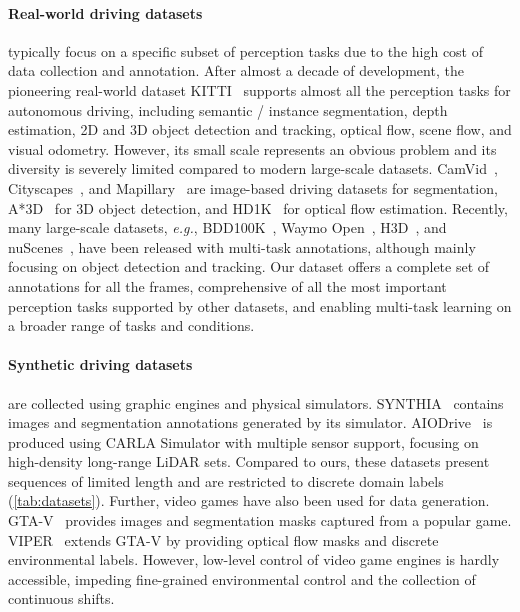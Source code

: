\paragraph{Real-world driving datasets} typically focus on a specific subset of perception tasks due to the high cost of data collection and annotation.  
After almost a decade of development, the pioneering real-world dataset KITTI~\cite{geiger2013vision} supports almost all the perception tasks for autonomous driving, including semantic / instance segmentation, depth estimation, 2D and 3D object detection and tracking, optical flow, scene flow, and visual odometry. However, its small scale represents an obvious problem and its diversity is severely limited compared to modern large-scale datasets. 
CamVid~\cite{brostow2009semantic}, Cityscapes~\cite{cordts2016cityscapes}, and Mapillary~\cite{neuhold2017mapillary} are image-based driving datasets for segmentation, A*3D~\cite{pham20203d} for 3D object detection, and HD1K~\cite{kondermann2016hci} for optical flow estimation.
Recently, many large-scale datasets, \textit{e.g.}, BDD100K~\cite{bdd100k}, Waymo Open~\cite{sun2020scalability}, H3D~\cite{patil2019h3d}, and nuScenes~\cite{caesar2020nuscenes}, have been released with multi-task annotations, although mainly focusing on object detection and tracking. 
Our dataset offers a complete set of annotations for all the frames, comprehensive of all the most important perception tasks supported by other datasets, and enabling multi-task learning on a broader range of tasks and conditions.

\paragraph{Synthetic driving datasets} are collected using graphic engines and physical simulators. SYNTHIA~\cite{ros2016synthia} contains images and segmentation annotations generated by its simulator.
AIODrive~\cite{Weng2020_AIODrive} is produced using CARLA Simulator with multiple sensor support, focusing on high-density long-range LiDAR sets. 
Compared to ours, these datasets present sequences of limited length and are restricted to discrete domain labels (\autoref{tab:datasets}).
Further, video games have also been used for data generation. GTA-V~\cite{richter2016playing,hu2021monocular}  provides images and segmentation masks captured from a popular game. VIPER~\cite{Richter_2017} extends GTA-V by providing optical flow masks and discrete environmental labels. However, low-level control of video game engines is hardly accessible, impeding fine-grained environmental control and the collection of continuous shifts.

